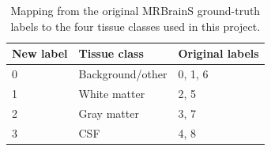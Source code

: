 \documentclass[10pt,a4paper,twoside]{article}
\begin{document}
\begin{table}[h]
\centering
\caption{Mapping from the original MRBrainS ground-truth labels to the four tissue classes used in this project.}
\label{tab:label-mapping}
\begin{tabular}{lll}
\toprule
New label & Tissue class & Original labels \\
\midrule
0 & Background/other & 0, 1, 6 \\
1 & White matter & 2, 5 \\
2 & Gray matter & 3, 7 \\
3 & CSF & 4, 8 \\
\bottomrule
\end{tabular}
\end{table}




\end{document}

